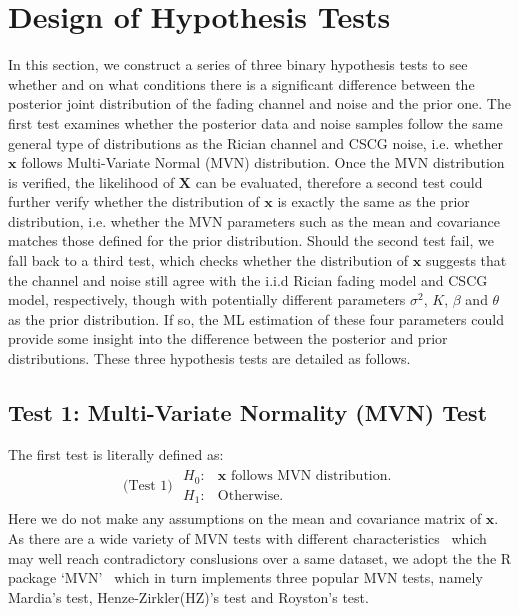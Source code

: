 \documentclass[journal,draftcls,onecolumn,12pt,twoside]{IEEEtran}
\begin{document}
\section{Design of Hypothesis Tests}
\label{sec:tests}
In this section, we construct a series of three binary hypothesis tests to see
whether and on what conditions there is a significant difference between the posterior
joint distribution of the fading channel and noise and the prior one. The first
test examines whether the posterior data and noise samples follow the same
general type of distributions as the Rician channel and CSCG noise, i.e. whether
$\mathbf{x}$ follows Multi-Variate Normal (MVN) distribution. Once the MVN
distribution is verified, the likelihood of $\mathbf{X}$ can be evaluated,
therefore a second test could further verify whether the distribution of
$\mathbf{x}$ is exactly the same as the prior distribution, i.e. whether the MVN
parameters such as the mean and covariance matches those defined for the prior
distribution. Should the second test fail, we fall back to a third test, which
checks whether the distribution of $\mathbf{x}$ suggests that the channel
and noise still agree with the i.i.d Rician fading model and CSCG model,
respectively, though with potentially different parameters $\sigma^2$, $K$,
$\beta$ and $\theta$ as the prior distribution. If so, the ML estimation of
these four parameters could provide some insight into the difference between the
posterior and prior distributions. These three hypothesis tests are detailed as
follows.

\subsection{Test 1: Multi-Variate Normality (MVN) Test}
The first test is literally defined as:
\begin{align}
  \mbox{(Test 1) } \begin{array}{ll}H_0: & \mathbf{x}\mbox{ follows MVN
  distribution.} \\ H_1: & \mbox{Otherwise.} \end{array}
\end{align}
Here we do not make any assumptions on the mean and covariance matrix of
$\mathbf{x}$. As there are a wide variety of MVN tests with different
characteristics~\cite{mecklin2005monte} which may well reach contradictory
conslusions over a same dataset, we adopt the the R package
`MVN'~\cite{korkmaz2014mvn} which in turn implements three popular MVN tests,
namely Mardia's test, Henze-Zirkler(HZ)'s test and Royston's test.
\end{document}
